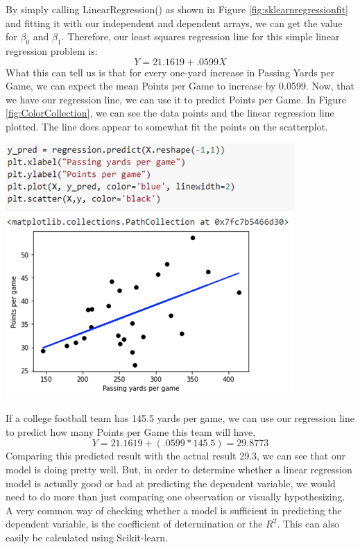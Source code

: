 \documentclass[a4paper,12pt]{report}
\begin{document}
By simply calling LinearRegression() as shown in Figure \ref{fig:sklearnregressionfit} and fitting it with our independent and dependent arrays, we can get the value for $\beta_0$ and $\beta_1$. Therefore, our least squares regression line for this simple linear regression problem is:
$$Y=21.1619+.0599X$$
What this can tell us is that for every one-yard increase in Passing Yards per Game, we can expect the mean Points per Game to increase by 0.0599. Now, that we have our regression line, we can use it to predict Points per Game. In Figure \ref{fig:ColorCollection}, we can see the data points and the linear regression line plotted. The line does appear to somewhat fit the points on the scatterplot. 

\begin{center}
    \captionsetup{type=figure}
    \includegraphics[width=.7\linewidth]{media/ColorCollection.png}
    \label{fig:ColorCollection}
\end{center}

If a college football team has 145.5 yards per game, we can use our regression line to predict how many Points per Game this team will have, 
$$Y=21.1619+(.0599*145.5)=29.8773$$
Comparing this predicted result with the actual result 29.3, we can see that our model is doing pretty well. But, in order to determine whether a linear regression model is actually good or bad at predicting the dependent variable, we would need to do more than just comparing one observation or visually hypothesizing. A very common way of checking whether a model is sufficient in predicting the dependent variable, is the coefficient of determination or the $R^2$. This can also easily be calculated using Scikit-learn. 
\end{document}
